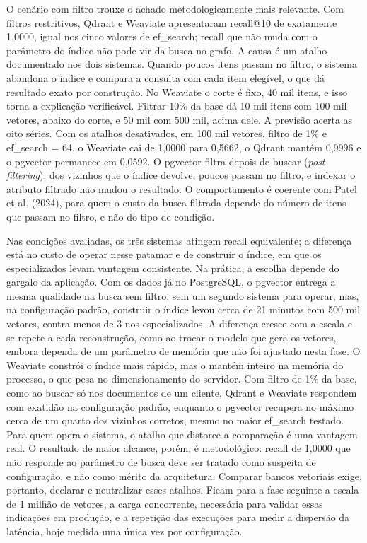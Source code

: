 \documentclass[12pt,a4paper]{article}
\newcommand{\secao}[1]{%
  \par\vspace{6pt}%
  \noindent{\fontsize{12}{14}\selectfont\bfseries #1}\par\vspace{2pt}%
}
\newcommand{\corpo}{\fontsize{10}{12}\selectfont}
\begin{document}
O cenário com filtro trouxe o achado metodologicamente mais relevante. Com filtros restritivos, Qdrant e Weaviate apresentaram recall@10 de exatamente 1,0000, igual nos cinco valores de ef\_search; recall que não muda com o parâmetro do índice não pode vir da busca no grafo. A causa é um atalho documentado nos dois sistemas. Quando poucos itens passam no filtro, o sistema abandona o índice e compara a consulta com cada item elegível, o que dá resultado exato por construção. No Weaviate o corte é fixo, 40 mil itens, e isso torna a explicação verificável. Filtrar 10\% da base dá 10 mil itens com 100 mil vetores, abaixo do corte, e 50 mil com 500 mil, acima dele. A previsão acerta as oito séries. Com os atalhos desativados, em 100 mil vetores, filtro de 1\% e ef\_search = 64, o Weaviate cai de 1,0000 para 0,5662, o Qdrant mantém 0,9996 e o pgvector permanece em 0,0592. O pgvector filtra depois de buscar (\textit{post-filtering}): dos vizinhos que o índice devolve, poucos passam no filtro, e indexar o atributo filtrado não mudou o resultado. O comportamento é coerente com Patel et al. (2024), para quem o custo da busca filtrada depende do número de itens que passam no filtro, e não do tipo de condição.

\secao{CONCLUSÕES}
\corpo
Nas condições avaliadas, os três sistemas atingem recall equivalente; a diferença está no custo de operar nesse patamar e de construir o índice, em que os especializados levam vantagem consistente. Na prática, a escolha depende do gargalo da aplicação. Com os dados já no PostgreSQL, o pgvector entrega a mesma qualidade na busca sem filtro, sem um segundo sistema para operar, mas, na configuração padrão, construir o índice levou cerca de 21 minutos com 500 mil vetores, contra menos de 3 nos especializados. A diferença cresce com a escala e se repete a cada reconstrução, como ao trocar o modelo que gera os vetores, embora dependa de um parâmetro de memória que não foi ajustado nesta fase. O Weaviate constrói o índice mais rápido, mas o mantém inteiro na memória do processo, o que pesa no dimensionamento do servidor. Com filtro de 1\% da base, como ao buscar só nos documentos de um cliente, Qdrant e Weaviate respondem com exatidão na configuração padrão, enquanto o pgvector recupera no máximo cerca de um quarto dos vizinhos corretos, mesmo no maior ef\_search testado. Para quem opera o sistema, o atalho que distorce a comparação é uma vantagem real. O resultado de maior alcance, porém, é metodológico: recall de 1,0000 que não responde ao parâmetro de busca deve ser tratado como suspeita de configuração, e não como mérito da arquitetura. Comparar bancos vetoriais exige, portanto, declarar e neutralizar esses atalhos. Ficam para a fase seguinte a escala de 1 milhão de vetores, a carga concorrente, necessária para validar essas indicações em produção, e a repetição das execuções para medir a dispersão da latência, hoje medida uma única vez por configuração.
\end{document}
